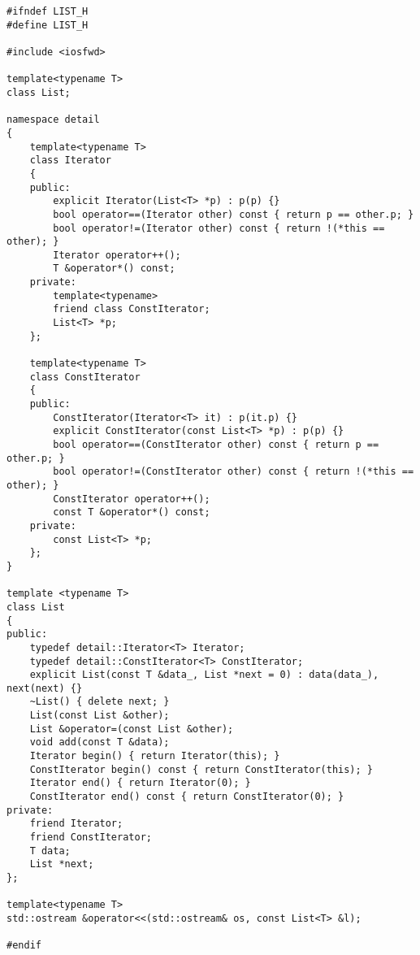 \documentclass[a4paper,11.5pt,table]{article}
\begin{document}
\begin{lstlisting}
#ifndef LIST_H
#define LIST_H

#include <iosfwd>

template<typename T>
class List;

namespace detail 
{
	template<typename T>
	class Iterator
	{
	public:
		explicit Iterator(List<T> *p) : p(p) {}
		bool operator==(Iterator other) const { return p == other.p; }
		bool operator!=(Iterator other) const { return !(*this == other); }
		Iterator operator++();
		T &operator*() const;
	private:
		template<typename>
		friend class ConstIterator;
		List<T> *p;
	};
	
	template<typename T>
	class ConstIterator
	{
	public:
		ConstIterator(Iterator<T> it) : p(it.p) {}
		explicit ConstIterator(const List<T> *p) : p(p) {}
		bool operator==(ConstIterator other) const { return p == other.p; }
		bool operator!=(ConstIterator other) const { return !(*this == other); }
		ConstIterator operator++();
		const T &operator*() const;
	private:
		const List<T> *p;
	};	
}

template <typename T>
class List 
{
public:
	typedef detail::Iterator<T> Iterator;
	typedef detail::ConstIterator<T> ConstIterator;
	explicit List(const T &data_, List *next = 0) : data(data_), next(next) {}
	~List() { delete next; }
	List(const List &other);
	List &operator=(const List &other);
	void add(const T &data);
	Iterator begin() { return Iterator(this); }
	ConstIterator begin() const { return ConstIterator(this); }
	Iterator end() { return Iterator(0); }
	ConstIterator end() const { return ConstIterator(0); }
private:
	friend Iterator;
	friend ConstIterator;
	T data;
	List *next;
};

template<typename T>
std::ostream &operator<<(std::ostream& os, const List<T> &l);

#endif
\end{lstlisting}
\end{document}
